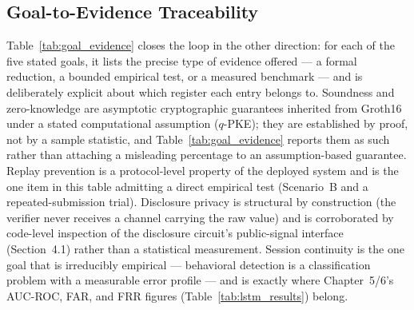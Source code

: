 \documentclass[12pt,a4paper,oneside]{report}
\begin{document}
\subsection{Goal-to-Evidence Traceability}

Table~\ref{tab:goal_evidence} closes the loop in the other direction:
for each of the five stated goals, it lists the precise type of
evidence offered --- a formal reduction, a bounded empirical test, or a
measured benchmark --- and is deliberately explicit about which
register each entry belongs to. Soundness and zero-knowledge are
asymptotic cryptographic guarantees inherited from Groth16 under a
stated computational assumption ($q$-PKE); they are established by
proof, not by a sample statistic, and Table~\ref{tab:goal_evidence}
reports them as such rather than attaching a misleading percentage to
an assumption-based guarantee. Replay prevention is a protocol-level
property of the deployed system and is the one item in this table
admitting a direct empirical test (Scenario~B and a repeated-submission
trial). Disclosure privacy is structural by construction (the verifier
never receives a channel carrying the raw value) and is corroborated by
code-level inspection of the disclosure circuit's public-signal
interface (Section~4.1) rather than a statistical measurement. Session
continuity is the one goal that is irreducibly empirical --- behavioral
detection is a classification problem with a measurable error profile
--- and is exactly where Chapter~5/6's AUC-ROC, FAR, and FRR figures
(Table~\ref{tab:lstm_results}) belong.
\end{document}
